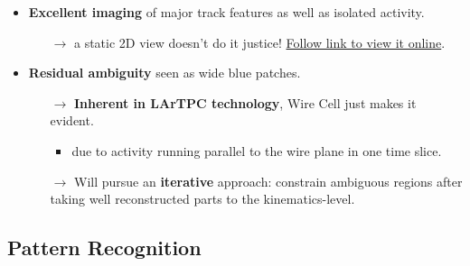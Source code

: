 \begin{frame}[fragile]
  \footnotesize
  \begin{itemize}
  \item \textbf{Excellent imaging} of major track features as well as isolated
    activity.
    \begin{itemize}\scriptsize
    \item[$\rightarrow$] a static 2D view doesn't do it justice!  \href{http://www.phy.bnl.gov/wire-cell/bee/set/6/event/0/}{Follow link to view it online}.
    \end{itemize}
  \item \textbf{Residual ambiguity} seen as wide blue patches.
    \begin{itemize}\scriptsize
    \item[$\rightarrow$] \textbf{Inherent in LArTPC technology}, Wire Cell just makes it evident.
      \begin{itemize}\scriptsize
      \item due to activity running parallel to the wire plane in one time slice.
      \end{itemize}
    \item[$\rightarrow$] Will pursue
      an \textbf{iterative} approach: constrain ambiguous regions
      after taking well reconstructed parts to the kinematics-level.
    \end{itemize}
  \end{itemize}
\end{frame}


\subsection{Pattern Recognition}

